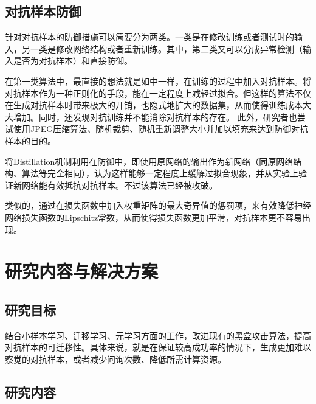 \section{对抗样本防御}

针对对抗样本的防御措施可以简要分为两类。一类是在修改训练或者测试时的输入，另一类是修改网络结构或者重新训练。其中，第二类又可以分成异常检测（输入是否为对抗样本）和直接防御。

在第一类算法中，最直接的想法就是如\cite{szegedy2014intriguing}\cite{goodfellow2015explaining}中一样，在训练的过程中加入对抗样本。将对抗样本作为一种正则化的手段，能在一定程度上减轻过拟合\cite{miyato2018virtual}。但这样的算法不仅在生成对抗样本时带来极大的开销\cite{szegedy2014intriguing}，也隐式地扩大的数据集，从而使得训练成本大大增加。同时，\citet{Moosavi-Dezfooli_2017_CVPR}还发现对抗训练并不能消除对抗样本的存在。
此外，研究者也尝试使用JPEG压缩算法\cite{dziugaite2016study}、随机裁剪\cite{luo2015foveationbased}、随机重新调整大小并加以填充\cite{xie2017adversarial}来达到防御对抗样本的目的。

\citet{papernot2016distillation}将Distillation机制\cite{hinton2015distilling}利用在防御中，即使用原网络的输出作为新网络（同原网络结构、算法等完全相同），认为这样能够一定程度上缓解过拟合现象，并从实验上验证新网络能有效抵抗对抗样本。不过该算法已经被\cite{carlini2017towards}攻破。

类似的，\citet{CisseBGDU17}通过在损失函数中加入权重矩阵的最大奇异值的惩罚项，来有效降低神经网络损失函数的Lipschitz常数，从而使得损失函数更加平滑，对抗样本更不容易出现。 	

\vspace{\baselineskip}
{\let\clearpage\relax \chapter{研究内容与解决方案}}

\section{研究目标}

结合小样本学习、迁移学习、元学习方面的工作，改进现有的黑盒攻击算法，提高对抗样本的可迁移性。具体来说，就是在保证较高成功率的情况下，生成更加难以察觉的对抗样本，或者减少问询次数、降低所需计算资源。

\section{研究内容}

